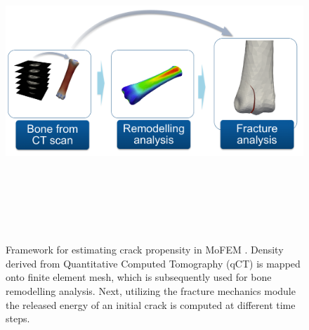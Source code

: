 \documentclass[11pt]{acmeArticle}
\numberwithin{equation}{section}
\begin{document}
\begin{figure}[h!]
\begin{center}
\includegraphics[width=12cm,height=12cm]{Figures/framework.png}
\caption{Framework for estimating crack propensity in MoFEM \citep{mofem2017}. Density derived from Quantitative Computed Tomography (qCT) is mapped onto finite element mesh, which is subsequently used for bone remodelling analysis. Next, utilizing the fracture mechanics module the released energy of an initial crack is computed at different time steps.}
\label{fig:scales}
\end{center}
\end{figure}
\end{document}
